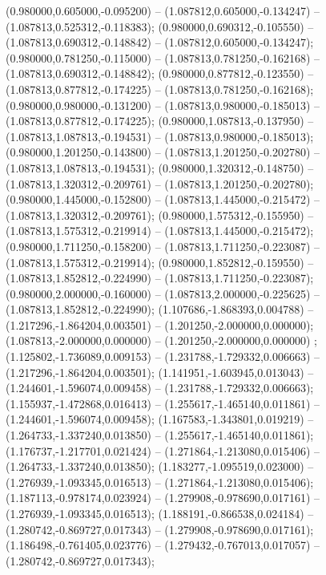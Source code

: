  (0.980000,0.605000,-0.095200) -- (1.087812,0.605000,-0.134247) -- (1.087813,0.525312,-0.118383);
 (0.980000,0.690312,-0.105550) -- (1.087813,0.690312,-0.148842) -- (1.087812,0.605000,-0.134247);
 (0.980000,0.781250,-0.115000) -- (1.087813,0.781250,-0.162168) -- (1.087813,0.690312,-0.148842);
 (0.980000,0.877812,-0.123550) -- (1.087813,0.877812,-0.174225) -- (1.087813,0.781250,-0.162168);
 (0.980000,0.980000,-0.131200) -- (1.087813,0.980000,-0.185013) -- (1.087813,0.877812,-0.174225);
 (0.980000,1.087813,-0.137950) -- (1.087813,1.087813,-0.194531) -- (1.087813,0.980000,-0.185013);
 (0.980000,1.201250,-0.143800) -- (1.087813,1.201250,-0.202780) -- (1.087813,1.087813,-0.194531);
 (0.980000,1.320312,-0.148750) -- (1.087813,1.320312,-0.209761) -- (1.087813,1.201250,-0.202780);
 (0.980000,1.445000,-0.152800) -- (1.087813,1.445000,-0.215472) -- (1.087813,1.320312,-0.209761);
 (0.980000,1.575312,-0.155950) -- (1.087813,1.575312,-0.219914) -- (1.087813,1.445000,-0.215472);
 (0.980000,1.711250,-0.158200) -- (1.087813,1.711250,-0.223087) -- (1.087813,1.575312,-0.219914);
 (0.980000,1.852812,-0.159550) -- (1.087813,1.852812,-0.224990) -- (1.087813,1.711250,-0.223087);
 (0.980000,2.000000,-0.160000) -- (1.087813,2.000000,-0.225625) -- (1.087813,1.852812,-0.224990);
 (1.107686,-1.868393,0.004788) -- (1.217296,-1.864204,0.003501) -- (1.201250,-2.000000,0.000000);
 (1.087813,-2.000000,0.000000) -- (1.201250,-2.000000,0.000000) ;
 (1.125802,-1.736089,0.009153) -- (1.231788,-1.729332,0.006663) -- (1.217296,-1.864204,0.003501);
 (1.141951,-1.603945,0.013043) -- (1.244601,-1.596074,0.009458) -- (1.231788,-1.729332,0.006663);
 (1.155937,-1.472868,0.016413) -- (1.255617,-1.465140,0.011861) -- (1.244601,-1.596074,0.009458);
 (1.167583,-1.343801,0.019219) -- (1.264733,-1.337240,0.013850) -- (1.255617,-1.465140,0.011861);
 (1.176737,-1.217701,0.021424) -- (1.271864,-1.213080,0.015406) -- (1.264733,-1.337240,0.013850);
 (1.183277,-1.095519,0.023000) -- (1.276939,-1.093345,0.016513) -- (1.271864,-1.213080,0.015406);
 (1.187113,-0.978174,0.023924) -- (1.279908,-0.978690,0.017161) -- (1.276939,-1.093345,0.016513);
 (1.188191,-0.866538,0.024184) -- (1.280742,-0.869727,0.017343) -- (1.279908,-0.978690,0.017161);
 (1.186498,-0.761405,0.023776) -- (1.279432,-0.767013,0.017057) -- (1.280742,-0.869727,0.017343);
